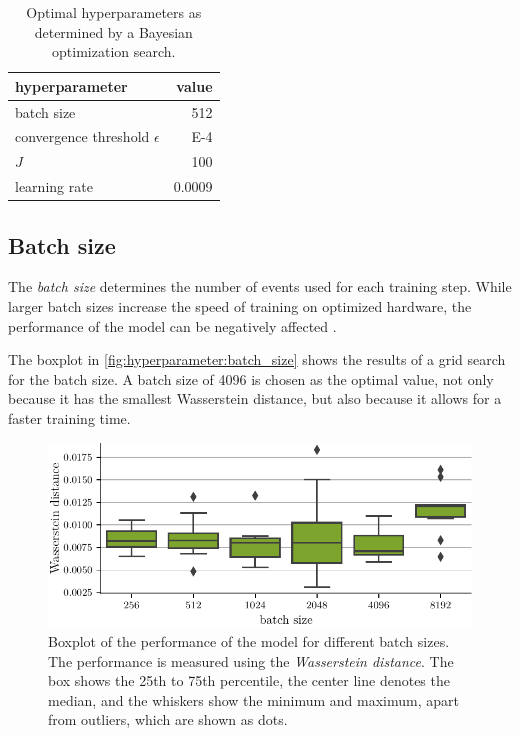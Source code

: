 \begin{table}
    \centering
    \caption{
      Optimal hyperparameters as determined by a Bayesian optimization search.
    }
    \label{tab:hyperparameters:initial}
    \begin{tabular}{l r}
        \toprule
        hyperparameter & {value} \\
        \midrule
        batch size & \num{512} \\
        convergence threshold $\epsilon$ & \num{E-4} \\
        $J$ & \num{100} \\ %
        learning rate & \num{0.0009} \\
        \bottomrule
    \end{tabular}
\end{table}


\FloatBarrier
\subsection{Batch size}
The \emph{batch size} determines the number of events used for each training step.
While larger batch sizes increase the speed of training
on optimized hardware,
the performance of the model can be negatively affected \cite{batchsize_kandel}.

The boxplot in \autoref{fig:hyperparameter:batch_size} shows the results of a grid search for the batch size.
A batch size of \num{4096} is chosen as the optimal value,
not only because it has the smallest Wasserstein distance,
but also because it allows for a faster training time.

\begin{figure}
  \centering
  \includegraphics[scale=1]{content/plots/hyperparam/batch_size_vs_wd_boxplot_lessheight.pdf}
  \caption{Boxplot of the performance of the model for different batch sizes.
    The performance is measured using the \emph{Wasserstein distance}.
    The box shows the 25th to 75th percentile,
    the center line denotes the median,
    and the whiskers show the minimum and maximum,
      apart from outliers,
        which are shown as dots.
  }
  \label{fig:hyperparameter:batch_size}
\end{figure}


